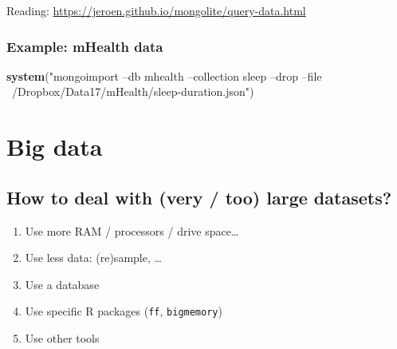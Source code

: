 \documentclass[]{book}
\newenvironment{Shaded}{\begin{snugshade}}{\end{snugshade}}
\newcommand{\KeywordTok}[1]{\textcolor[rgb]{0.13,0.29,0.53}{\textbf{#1}}}
\newcommand{\DataTypeTok}[1]{\textcolor[rgb]{0.13,0.29,0.53}{#1}}
\newcommand{\StringTok}[1]{\textcolor[rgb]{0.31,0.60,0.02}{#1}}
\newcommand{\CommentTok}[1]{\textcolor[rgb]{0.56,0.35,0.01}{\textit{#1}}}
\newcommand{\OperatorTok}[1]{\textcolor[rgb]{0.81,0.36,0.00}{\textbf{#1}}}
\newcommand{\NormalTok}[1]{#1}
\providecommand{\tightlist}{%
  \setlength{\itemsep}{0pt}\setlength{\parskip}{0pt}}
\theoremstyle{definition}
\theoremstyle{definition}
\theoremstyle{definition}
\theoremstyle{remark}
\begin{document}
Reading: \url{https://jeroen.github.io/mongolite/query-data.html}

\subsection{Example: mHealth data}\label{example-mhealth-data}

\begin{Shaded}
\begin{Highlighting}[]
\KeywordTok{system}\NormalTok{(}\StringTok{"mongoimport --db mhealth --collection sleep --drop --file ~/Dropbox/Data17/mHealth/sleep-duration.json"}\NormalTok{)}
\end{Highlighting}
\end{Shaded}

\begin{Shaded}
\end{Shaded}

\chapter{Big data}\label{bigdata}

\section{How to deal with (very / too) large
datasets?}\label{how-to-deal-with-very-too-large-datasets}

\begin{enumerate}
\def\labelenumi{\arabic{enumi}.}
\tightlist
\item
  Use more RAM / processors / drive space\ldots{}
\item
  Use less data: (re)sample, \ldots{}
\item
  Use a database
\item
  Use specific R packages (\texttt{ff}, \texttt{bigmemory})
\item
  Use other tools
\end{enumerate}
\end{document}
